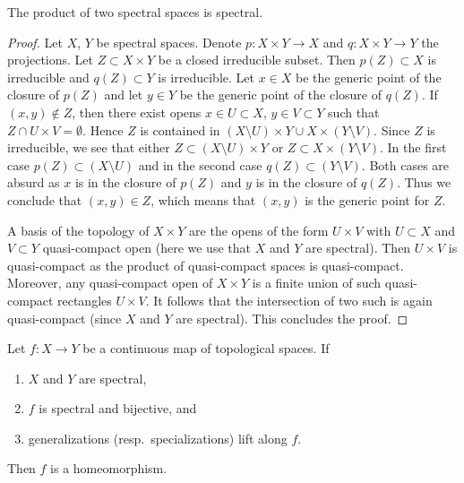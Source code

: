 \begin{lemma}
\label{lemma-product-spectral-spaces}
The product of two spectral spaces is spectral.
\end{lemma}

\begin{proof}
Let $X$, $Y$ be spectral spaces. Denote $p : X \times Y \to X$ and
$q : X \times Y \to Y$ the projections. Let $Z \subset X \times Y$ be a
closed irreducible subset. Then $p(Z) \subset X$ is irreducible
and $q(Z) \subset Y$ is irreducible. Let $x \in X$ be the generic
point of the closure of $p(Z)$ and let $y \in Y$ be the generic
point of the closure of $q(Z)$. If $(x, y) \not \in Z$, then
there exist opens $x \in U \subset X$, $y \in V \subset Y$ such
that $Z \cap U \times V = \emptyset$. Hence $Z$ is contained
in $(X \setminus U) \times Y \cup X \times (Y \setminus V)$.
Since $Z$ is irreducible, we see that either
$Z \subset (X \setminus U) \times Y$ or $Z \subset X \times (Y \setminus V)$.
In the first case $p(Z) \subset (X \setminus U)$ and in the
second case $q(Z) \subset (Y \setminus V)$. Both cases are absurd
as $x$ is in the closure of $p(Z)$ and $y$ is in the closure of
$q(Z)$. Thus we conclude that $(x, y) \in Z$, which means that
$(x, y)$ is the generic point for $Z$.

\medskip\noindent
A basis of the topology of $X \times Y$ are the opens of the form
$U \times V$ with $U \subset X$ and $V \subset Y$ quasi-compact open
(here we use that $X$ and $Y$ are spectral). Then $U \times V$ is
quasi-compact as the product of quasi-compact spaces is quasi-compact.
Moreover, any quasi-compact open of $X \times Y$ is a finite union
of such quasi-compact rectangles $U \times V$. It follows that
the intersection of two such is again quasi-compact
(since $X$ and $Y$ are spectral). This concludes the proof.
\end{proof}

\begin{lemma}
\label{lemma-spectral-bijective}
Let $f : X \to Y$ be a continuous map of topological spaces. If
\begin{enumerate}
\item $X$ and $Y$ are spectral,
\item $f$ is spectral and bijective, and
\item generalizations (resp.\ specializations) lift along $f$.
\end{enumerate}
Then $f$ is a homeomorphism.
\end{lemma}

